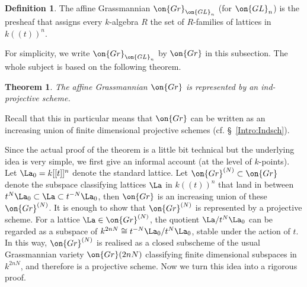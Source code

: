 \documentclass[]{pcmi}
\theoremstyle{plain}
\newtheorem{thm}[equation]{Theorem}
\theoremstyle{remark}
\theoremstyle{definition}
\newtheorem{dfn}[equation]{Definition}
\newcommand{\Gr}{{\on{Gr}}}
\newcommand{\GL}{{\on{GL}}}
\begin{document}
\begin{dfn}
The affine Grassmannian $\Gr_{\GL_n}$ (for $\GL_n$) is the presheaf that assigns every $k$-algebra $R$ the set of $R$-families of lattices in $k((t))^n$. 
\end{dfn}

For simplicity, we write $\Gr_{\GL_n}$ by $\Gr$ in this subsection.
The whole subject is based on the following theorem. 

\begin{thm}\label{rep}
The affine Grassmannian $\Gr$ is represented by an ind-projective scheme.
\end{thm}
Recall that this in particular means that $\Gr$ can be written as an increasing union of finite dimensional projective schemes (cf. \S~\ref{Intro:Indsch}). 

Since the actual proof of the theorem is a little bit technical but the underlying idea is very simple, we first give an informal account (at the level of $k$-points). Let $\La_0=k[[t]]^n$ denote the standard lattice. Let $\Gr^{(N)}\subset \Gr$ denote the subspace classifying lattices $\La$ in $k((t))^n$ that land in between $t^N\La_0\subset \La\subset t^{-N}\La_0$, then $\Gr$ is an increasing union of these $\Gr^{(N)}$. It is enough to show that $\Gr^{(N)}$ is represented by a projective scheme.
For a lattice $\La\in \Gr^{(N)}$, the quotient $\La/t^N\La_0$ can be regarded as a subspace of $k^{2nN}\cong t^{-N}\La_0/t^N\La_0$, stable under the action of $t$. In this way, $\Gr^{(N)}$ is realised as a closed subscheme of the usual Grassmannian variety $\Gr(2nN)$ classifying finite dimensional subspaces in $k^{2nN}$, and therefore is a projective scheme. Now we turn this idea into a rigorous proof.
\end{document}
